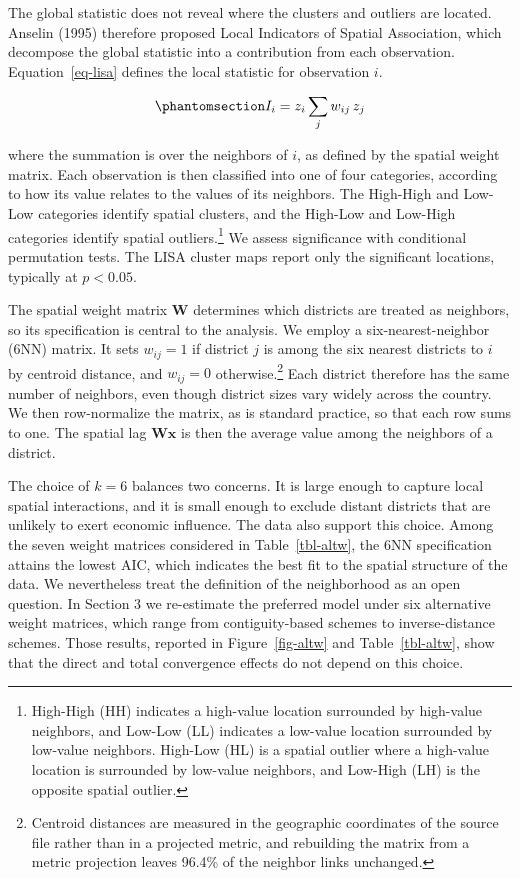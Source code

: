 \documentclass[
  letterpaper,
  DIV=11,
  numbers=noendperiod]{scrartcl}
\begin{document}
The global statistic does not reveal where the clusters and outliers are
located. Anselin (1995) therefore proposed Local Indicators of Spatial
Association, which decompose the global statistic into a contribution
from each observation. Equation~\ref{eq-lisa} defines the local
statistic for observation \(i\).

\begin{equation}\phantomsection\label{eq-lisa}{
I_i = z_i \sum_j w_{ij} \, z_j
}\end{equation}

where the summation is over the neighbors of \(i\), as defined by the
spatial weight matrix. Each observation is then classified into one of
four categories, according to how its value relates to the values of its
neighbors. The High-High and Low-Low categories identify spatial
clusters, and the High-Low and Low-High categories identify spatial
outliers.\footnote{High-High (HH) indicates a high-value location
  surrounded by high-value neighbors, and Low-Low (LL) indicates a
  low-value location surrounded by low-value neighbors. High-Low (HL) is
  a spatial outlier where a high-value location is surrounded by
  low-value neighbors, and Low-High (LH) is the opposite spatial
  outlier.} We assess significance with conditional permutation tests.
The LISA cluster maps report only the significant locations, typically
at \(p < 0.05\).

The spatial weight matrix \(\mathbf{W}\) determines which districts are
treated as neighbors, so its specification is central to the analysis.
We employ a six-nearest-neighbor (6NN) matrix. It sets \(w_{ij} = 1\) if
district \(j\) is among the six nearest districts to \(i\) by centroid
distance, and \(w_{ij} = 0\) otherwise.\footnote{Centroid distances are
  measured in the geographic coordinates of the source file rather than
  in a projected metric, and rebuilding the matrix from a metric
  projection leaves 96.4\% of the neighbor links unchanged.} Each
district therefore has the same number of neighbors, even though
district sizes vary widely across the country. We then row-normalize the
matrix, as is standard practice, so that each row sums to one. The
spatial lag \(\mathbf{W} \mathbf{x}\) is then the average value among
the neighbors of a district.

The choice of \(k = 6\) balances two concerns. It is large enough to
capture local spatial interactions, and it is small enough to exclude
distant districts that are unlikely to exert economic influence. The
data also support this choice. Among the seven weight matrices
considered in Table~\ref{tbl-altw}, the 6NN specification attains the
lowest AIC, which indicates the best fit to the spatial structure of the
data. We nevertheless treat the definition of the neighborhood as an
open question. In Section 3 we re-estimate the preferred model under six
alternative weight matrices, which range from contiguity-based schemes
to inverse-distance schemes. Those results, reported in
Figure~\ref{fig-altw} and Table~\ref{tbl-altw}, show that the direct and
total convergence effects do not depend on this choice.
\end{document}
